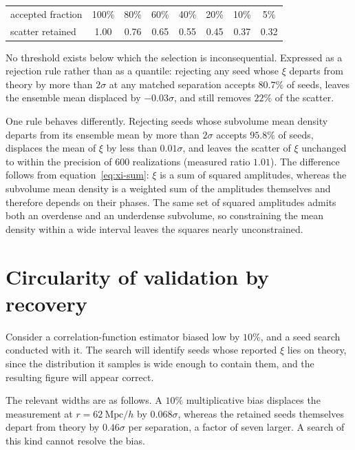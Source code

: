\documentclass[12pt]{article}
\newcommand{\Mpch}{\ \mathrm{Mpc}/h}
\begin{document}
\begin{center}
\begin{tabular}{lccccccc}
  \toprule
  accepted fraction & 100\% & 80\% & 60\% & 40\% & 20\% & 10\% & 5\%\\
  scatter retained  & 1.00 & 0.76 & 0.65 & 0.55 & 0.45 & 0.37 & 0.32\\
  \bottomrule
\end{tabular}
\end{center}

\noindent
No threshold exists below which the selection is inconsequential.  Expressed as
a rejection rule rather than as a quantile: rejecting any seed whose $\xi$
departs from theory by more than $2\sigma$ at any matched separation accepts
$80.7\%$ of seeds, leaves the ensemble mean displaced by $-0.03\sigma$, and
still removes $22\%$ of the scatter.

One rule behaves differently.  Rejecting seeds whose subvolume mean density
departs from its ensemble mean by more than $2\sigma$ accepts $95.8\%$ of
seeds, displaces the mean of $\xi$ by less than $0.01\sigma$, and leaves the
scatter of $\xi$ unchanged to within the precision of 600 realizations
(measured ratio $1.01$).  The difference follows from
equation~\eqref{eq:xi-sum}: $\xi$ is a sum of squared amplitudes, whereas the
subvolume mean density is a weighted sum of the amplitudes themselves and
therefore depends on their phases.  The same set of squared amplitudes admits
both an overdense and an underdense subvolume, so constraining the mean density
within a wide interval leaves the squares nearly unconstrained.

\section{Circularity of validation by recovery}\label{sec:circular}

Consider a correlation-function estimator biased low by $10\%$, and a seed
search conducted with it.  The search will identify seeds whose reported $\xi$
lies on theory, since the distribution it samples is wide enough to contain
them, and the resulting figure will appear correct.

The relevant widths are as follows.  A $10\%$ multiplicative bias displaces the
measurement at $r = 62\Mpch$ by $0.068\sigma$, whereas the retained seeds
themselves depart from theory by $0.46\sigma$ per separation, a factor of seven
larger.  A search of this kind cannot resolve the bias.
\end{document}
